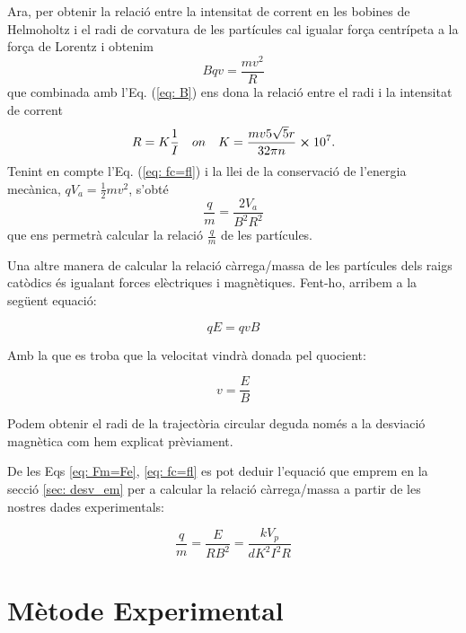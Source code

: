 \documentclass[11pt]{article}
\begin{document}
Ara, per obtenir la relació entre la intensitat de corrent en les bobines de Helmoholtz i el radi de corvatura de les partícules cal igualar força centrípeta a la força de Lorentz i obtenim 
\begin{equation}
    Bqv=\frac{mv^2}{R}
    \label{eq: fc=fl}
\end{equation}
que combinada amb l'Eq. (\ref{eq: B}) ens dona la relació entre el radi i la intensitat de corrent
\begin{equation}
    R=K\frac{1}{I} \quad on \quad K=\frac{mv5\sqrt{5}r}{32\pi n}\cross 10^7.
    \label{eq: IvsR}
\end{equation}
Tenint en compte l'Eq. (\ref{eq: fc=fl}) i la llei de la conservació de l'energia mecànica, $qV_a = \frac{1}{2}mv^2$, s'obté 
\begin{equation}
    \frac{q}{m}=\frac{2V_a }{B^2R^2}
    \label{eq: q/m}
\end{equation}
que ens permetrà calcular la relació $\frac{q}{m}$ de les partícules.


\vspace{1cm}

Una altre manera de calcular la relació càrrega/massa de les partícules dels raigs catòdics és igualant forces elèctriques i magnètiques. Fent-ho, arribem a la següent equació:

\begin{equation}\label{eq: Fm=Fe}
    qE = qvB
\end{equation}

Amb la que es troba que la velocitat vindrà donada pel quocient:

\begin{equation}
    v = \frac{E}{B}
\end{equation}

Podem obtenir el radi de la trajectòria circular deguda només a la desviació magnètica com hem explicat prèviament.

De les Eqs \eqref{eq: Fm=Fe}, \eqref{eq: fc=fl} es pot deduir l'equació que emprem en la secció \ref{sec: desv_em} per a calcular la relació càrrega/massa a partir de les nostres dades experimentals:

\begin{equation}
    \frac{q}{m}=\frac{E}{RB^2}=\frac{kV_p}{dK^2I^2R}
\end{equation}

\newpage
\section{Mètode Experimental}
\end{document}
